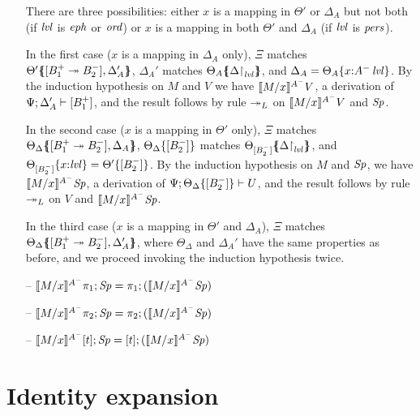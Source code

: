 \begin{itemize}
  There are three possibilities: either $x$ is a mapping in 
  $\Theta'$ or $\Delta_A$ but not both (if $\mlvl$ is $\meph$
  or $\mtrue$) or $x$ is a mapping in both $\Theta'$ and $\Delta_A$
  (if $\mlvl$ is $\mpers$). 

  In the first case ($x$ is a mapping in $\Delta_A$ only), 
  $\Xi$ matches 
  $\frameoff{\Theta'}{\matchconj{[B_1^+ \righti B_2^-]}{\Delta_A'}}$,
  $\Delta_A'$ matches $\frameoff{\Theta_A}{\restrictto{\Delta}{\mlvl}}$, and 
  $\Delta_A = \tackon{\Theta_A}{x{:}\islvl{A^-}}$. 
  By the induction hypothesis on $M$ and $V$ we have
  $\rsubsta{M}{x}{V}{A^-}$, a derivation of $\foc{\Psi}{\Delta'_A}{[B_1^+]}$,
  and the result follows by rule ${\righti}_L$ on 
  $\rsubsta{M}{x}{V}{A^-}$ and $\Sp$.

  In the second case ($x$ is a mapping in $\Theta'$ only),
  $\Xi$ matches 
  $\frameoff{\Theta_\Delta}{\matchconj{[B_1^+ \righti B_2^-]}{\Delta_A}}$,
  $\tackon{\Theta_\Delta}{[B_2^-]}$ matches
  $\frameoff{\Theta_{[B_2^-]}}{\restrictto{\Delta}{\mlvl}}$,
  and  
  $\tackon{\Theta_{[B_2^-]}}{x{:}\mlvl} = \tackon{\Theta'}{[B_2^-]}$.
  By the induction hypothesis on $M$ and $\Sp$, we have 
  $\rsubsta{M}{x}{\Sp}{A^-}$, a derivation of 
  $\foc{\Psi}{\tackon{\Theta_\Delta}{[B_2^-]}}{U}$, and the result follows
  by rule ${\righti}_L$ on $V$ and $\rsubsta{M}{x}{\Sp}{A^-}$.

  In the third case ($x$ is a mapping in $\Theta'$ and $\Delta_A$), 
  $\Xi$ matches 
  $\frameoff{\Theta_\Delta}{\matchconj{[B_1^+ \righti B_2^-]}{\Delta_A'}}$,
  where $\Theta_\Delta$ and $\Delta_A'$ have the same properties as before,
  and we proceed invoking the induction hypothesis twice.

\smallskip
  
\item[--] $\rsubsta{M}{x}{\tpione{\Sp}}{A^-} 
           = \tpione{(\rsubsta{M}{x}{\Sp}{A^-})}$
\item[--] $\rsubsta{M}{x}{\tpitwo{\Sp}}{A^-} 
           = \tpitwo{(\rsubsta{M}{x}{\Sp}{A^-})}$
\item[--] $\rsubsta{M}{x}{\tforalll{t}{\Sp}}{A^-} 
           = \tforalll{t}{(\rsubsta{M}{x}{\Sp}{A^-})}$
\end{itemize}

\section{Identity expansion}
\label{sec:ord-identity}

